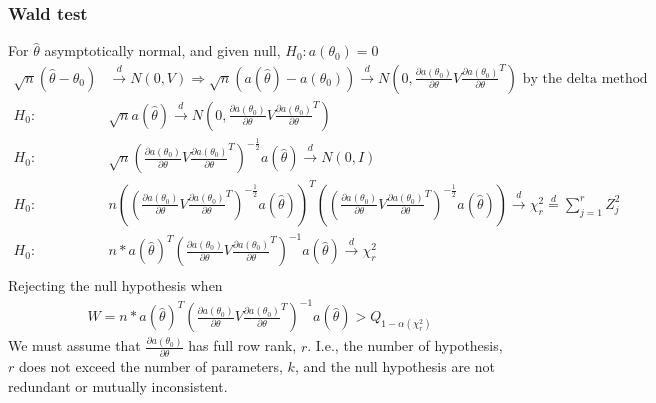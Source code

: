 \documentclass{article}
\begin{document}
\subsubsection{Wald test}
For $\hat{\theta}$ asymptotically normal, and given null, $H_0: a(\theta_0) = 0$
\begin{align*}
  \sqrt{n}(\hat{\theta} - \theta_0) &\overset{d}{\longrightarrow} N(0, V) \Longrightarrow \sqrt{n}(a(\hat{\theta}) - a(\theta_0)) \overset{d}{\longrightarrow} N\left(0, \frac{\partial a(\theta_0)}{\partial \theta}V\frac{\partial a(\theta_0)}{\partial \theta}^T\right) \textrm{ by the delta method}\\
  H_0:\;\; & \sqrt{n} a(\hat{\theta}) \overset{d}{\longrightarrow} N\left(0, \frac{\partial a(\theta_0)}{\partial \theta}V\frac{\partial a(\theta_0)}{\partial \theta}^T\right)\\
  H_0:\;\; & \sqrt{n} \left(\frac{\partial a(\theta_0)}{\partial \theta}V\frac{\partial a(\theta_0)}{\partial \theta}^T\right)^{-\frac{1}{2}}a(\hat{\theta}) \overset{d}{\longrightarrow} N(0, I)\\
  H_0:\;\; & n \left(\left(\frac{\partial a(\theta_0)}{\partial \theta}V\frac{\partial a(\theta_0)}{\partial \theta}^T\right)^{-\frac{1}{2}}a(\hat{\theta})\right)^T \left(\left(\frac{\partial a(\theta_0)}{\partial \theta}V\frac{\partial a(\theta_0)}{\partial \theta}^T\right)^{-\frac{1}{2}}a(\hat{\theta})\right)\overset{d}{\longrightarrow} \chi_r^2 \overset{d}{=} \sum_{j=1}^r Z_j^2\\
  H_0:\;\; & n * a(\hat{\theta})^T \left(\frac{\partial a(\theta_0)}{\partial \theta}V\frac{\partial a(\theta_0)}{\partial \theta}^T\right)^{-1}a(\hat{\theta}) \overset{d}{\longrightarrow} \chi_r^2 \\
\end{align*}
Rejecting the null hypothesis when
\begin{align*}
  W = n * a(\hat{\theta})^T \left(\frac{\partial a(\theta_0)}{\partial \theta}V\frac{\partial a(\theta_0)}{\partial \theta}^T\right)^{-1}a(\hat{\theta}) > Q_{1-\alpha(\chi_r^2)}
\end{align*}
We must assume that $\frac{\partial a(\theta_0)}{\partial \theta}$ has full row rank, $r$. I.e., the number of hypothesis, $r$ does not exceed the number of parameters, $k$, and the null hypothesis are not redundant or mutually inconsistent.
\end{document}
